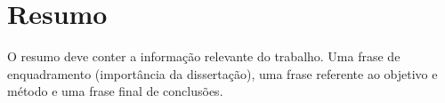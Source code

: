 \chapter{Resumo}
O resumo deve conter a informação relevante do trabalho. Uma frase de enquadramento (importância da dissertação), uma frase referente ao objetivo e método e uma frase final de conclusões.

 \vspace{0.5cm} %

